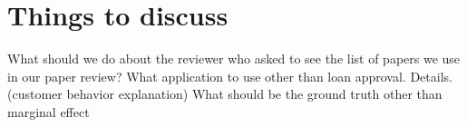 \documentclass[mnsc,blindrev]{informs3}
\begin{document}
\section{Things to discuss}
\begin{outline}[enumerate]
 \1 What should we do about the reviewer who asked to see the list of papers we use in our paper review?
\1	What application to use other than loan approval. Details. (customer behavior explanation)
\1 What should be the ground truth other than marginal effect

\end{outline}
\end{document}
